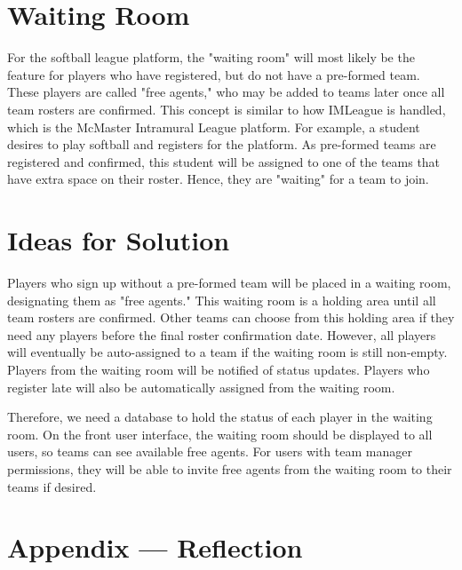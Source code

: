 \documentclass[12pt, titlepage]{article}
\begin{document}
\section{Waiting Room}
For the softball league platform, the "waiting room" will most likely be the feature for players who have registered, but do not have a pre-formed team. These players are called "free agents," who may be added to teams later once all team rosters are confirmed. This concept is similar to how IMLeague is handled, which is the McMaster Intramural League platform. For example, a student desires to play softball and registers for the platform. As pre-formed teams are registered and confirmed, this student will be assigned to one of the teams that have extra space on their roster. Hence, they are "waiting" for a team to join.

\section{Ideas for Solution}
Players who sign up without a pre-formed team will be placed in a waiting room, designating them as "free agents." This waiting room is a holding area until all team rosters are confirmed. Other teams can choose from this holding area if they need any players before the final roster confirmation date. However, all players will eventually be auto-assigned to a team if the waiting room is still non-empty. Players from the waiting room will be notified of status updates. Players who register late will also be automatically assigned from the waiting room.

Therefore, we need a database to hold the status of each player in the waiting room. On the front user interface, the waiting room should be displayed to all users, so teams can see available free agents. For users with team manager permissions, they will be able to invite free agents from the waiting room to their teams if desired.

\newpage{}
\section*{Appendix --- Reflection}




\end{document}
